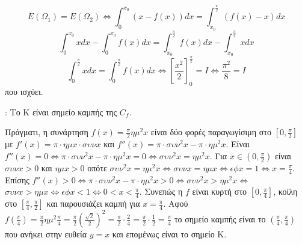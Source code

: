 \begin{alist}
\begin{rlist}
        \[ E(\Omega_1) = E(\Omega_2) \Leftrightarrow \int_0^{x_0} (x-f(x))dx = \int_{x_0}^{\frac{\pi}{2}} (f(x)-x)dx \]
        \[ \int_0^{x_0} x dx - \int_0^{x_0} f(x) dx = \int_{x_0}^{\frac{\pi}{2}} f(x) dx - \int_{x_0}^{\frac{\pi}{2}} x dx \]
        \[ \int_0^{\frac{\pi}{2}} x dx = \int_0^{\frac{\pi}{2}} f(x) dx \Leftrightarrow \left[\frac{x^2}{2}\right]_0^{\frac{\pi}{2}} = I \Leftrightarrow \frac{\pi^2}{8} = I \]
        που ισχύει.
    \end{rlist}
    : Το K είναι σημείο καμπής της $C_f$.
    \par Πράγματι, η συνάρτηση $f(x) = \frac{\pi}{2} \eta \mu^2 x$ είναι δύο φορές παραγωγίσιμη στο $\left[0, \frac{\pi}{2}\right]$ με
    $f'(x) = \pi \cdot \eta \mu x \cdot \sigma υ \nu x$ και $f''(x) = \pi \cdot \sigma υ \nu^2 x - \pi \cdot \eta \mu^2 x$. Είναι
    $f''(x) = 0 \Leftrightarrow \pi \cdot \sigma υ \nu^2 x - \pi \cdot \eta \mu^2 x = 0 \Leftrightarrow \sigma υ \nu^2 x = \eta \mu^2 x$.
    Για $x \in \left(0, \frac{\pi}{2}\right)$ είναι $\sigma υ \nu x > 0$ και $\eta \mu x > 0$ οπότε
    $\sigma υ \nu^2 x = \eta \mu^2 x \Leftrightarrow \sigma υ \nu x = \eta \mu x \Leftrightarrow \epsilon \phi x = 1 \Leftrightarrow x = \frac{\pi}{4}$. Επίσης
    $f''(x) > 0 \Leftrightarrow \pi \cdot \sigma υ \nu^2 x - \pi \cdot \eta \mu^2 x > 0 \Leftrightarrow \sigma υ \nu^2 x > \eta \mu^2 x \Leftrightarrow$
    $\sigma υ \nu x > \eta \mu x \Leftrightarrow \epsilon \phi x < 1 \Leftrightarrow 0 < x < \frac{\pi}{4}$.
    Συνεπώς η $f$ είναι κυρτή στο $\left[0, \frac{\pi}{4}\right]$, κοίλη στο $\left[\frac{\pi}{4}, \frac{\pi}{2}\right]$ και παρουσιάζει καμπή για $x = \frac{\pi}{4}$.
    Αφού $f\left(\frac{\pi}{4}\right) = \frac{\pi}{2} \eta \mu^2 \frac{\pi}{4} = \frac{\pi}{2} \left(\frac{\sqrt{2}}{2}\right)^2 = \frac{\pi}{2} \cdot \frac{2}{4} = \frac{\pi}{2} \cdot \frac{1}{2} = \frac{\pi}{4}$ το σημείο καμπής είναι το $\left(\frac{\pi}{4}, \frac{\pi}{4}\right)$ που ανήκει στην ευθεία $y=x$ και επομένως είναι το σημείο K.
\end{alist}